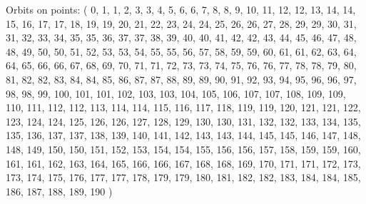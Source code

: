 \documentclass[12pt]{article}
\begin{document}
{\bigskip

Orbits on points: ( 0, 1, 1, 2, 3, 3, 4, 5, 6, 6, 7, 8, 8, 9, 10, 11, 12, 12, 13, 14, 14, 15, 16, 17, 17, 18, 19, 19, 20, 21, 22, 23, 24, 24, 25, 26, 26, 27, 28, 29, 29, 30, 31, 31, 32, 33, 34, 35, 35, 36, 37, 37, 38, 39, 40, 40, 41, 42, 42, 43, 44, 45, 46, 47, 48, 48, 49, 50, 50, 51, 52, 53, 53, 54, 55, 55, 56, 57, 58, 59, 59, 60, 61, 61, 62, 63, 64, 64, 65, 66, 66, 67, 68, 69, 70, 71, 71, 72, 73, 73, 74, 75, 76, 76, 77, 78, 78, 79, 80, 81, 82, 82, 83, 84, 84, 85, 86, 87, 87, 88, 89, 89, 90, 91, 92, 93, 94, 95, 96, 96, 97, 98, 98, 99, 100, 101, 101, 102, 103, 103, 104, 105, 106, 107, 107, 108, 109, 109, 110, 111, 112, 112, 113, 114, 114, 115, 116, 117, 118, 119, 119, 120, 121, 121, 122, 123, 124, 124, 125, 126, 126, 127, 128, 129, 130, 130, 131, 132, 132, 133, 134, 135, 135, 136, 137, 137, 138, 139, 140, 141, 142, 143, 143, 144, 145, 145, 146, 147, 148, 148, 149, 150, 150, 151, 152, 153, 154, 154, 155, 156, 156, 157, 158, 159, 159, 160, 161, 161, 162, 163, 164, 165, 166, 166, 167, 168, 168, 169, 170, 171, 171, 172, 173, 173, 174, 175, 176, 177, 177, 178, 179, 179, 180, 181, 182, 182, 183, 184, 184, 185, 186, 187, 188, 189, 190 )\\


%


%


}%
\end{document}
